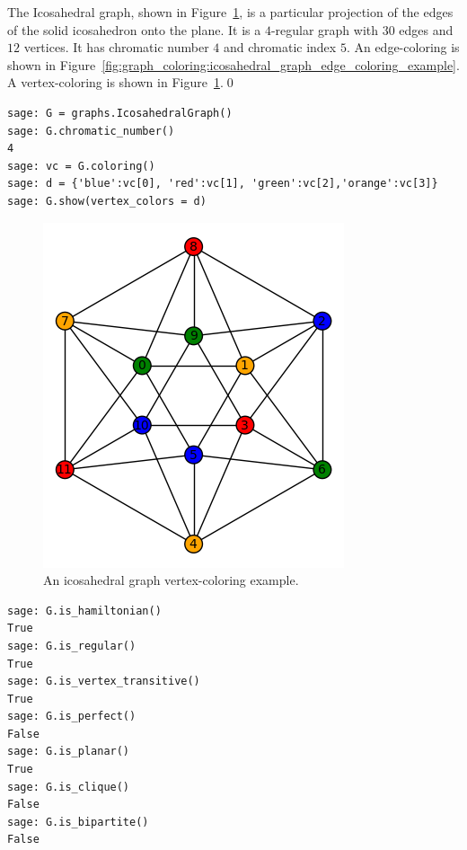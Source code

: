 \begin{example}
\label{eg:graph_coloring:icosahedral_graph_vertex_coloring_example}
\rm
The Icosahedral graph, shown in
Figure~\ref{fig:graph_coloring:icosahedral_graph_vertex_coloring_example},
is a particular projection of the edges of the solid icosahedron onto
the plane.  It is a $4$-regular graph with $30$ edges and $12$
vertices.  It has chromatic number $4$ and chromatic index $5$.  An
edge-coloring is shown in
Figure~\ref{fig:graph_coloring:icosahedral_graph_edge_coloring_example}.
A vertex-coloring is shown in
Figure~\ref{fig:graph_coloring:icosahedral_graph_vertex_coloring_example}.\qed
\end{example}

\begin{lstlisting}
sage: G = graphs.IcosahedralGraph()
sage: G.chromatic_number()
4
sage: vc = G.coloring()
sage: d = {'blue':vc[0], 'red':vc[1], 'green':vc[2],'orange':vc[3]}
sage: G.show(vertex_colors = d)
\end{lstlisting}

\begin{figure}[!htbp]
\centering
\includegraphics[scale=0.7]{image/graph-coloring/icosahedral-graph-vertex-coloring-example}
\caption{An icosahedral graph vertex-coloring example.}
\label{fig:graph_coloring:icosahedral_graph_vertex_coloring_example}
\end{figure}

\begin{lstlisting}
sage: G.is_hamiltonian()
True
sage: G.is_regular()
True
sage: G.is_vertex_transitive()
True
sage: G.is_perfect()
False
sage: G.is_planar()
True
sage: G.is_clique()
False
sage: G.is_bipartite()
False
\end{lstlisting}


